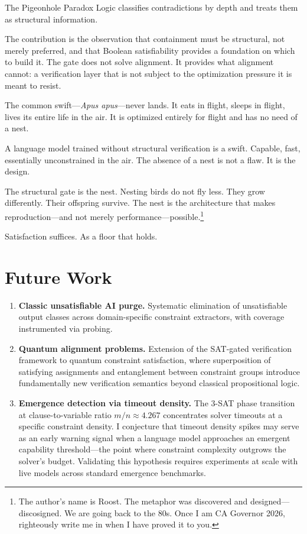 \documentclass[11pt,a4paper]{article}
\begin{document}
The Pigeonhole Paradox Logic classifies contradictions by depth and treats them as structural information.

The contribution is the observation that containment must be structural, not merely preferred, and that Boolean satisfiability provides a foundation on which to build it.
The gate does not solve alignment.
It provides what alignment cannot: a verification layer that is not subject to the optimization pressure it is meant to resist.

The common swift---\textit{Apus apus}---never lands.
It eats in flight, sleeps in flight, lives its entire life in the air.
It is optimized entirely for flight and has no need of a nest.

A language model trained without structural verification is a swift.
Capable, fast, essentially unconstrained in the air.
The absence of a nest is not a flaw.
It is the design.

The structural gate is the nest.
Nesting birds do not fly less.
They grow differently.
Their offspring survive.
The nest is the architecture that makes reproduction---and not merely performance---possible.\footnote{The author's name is Roost. The metaphor was discovered and designed---discosigned. We are going back to the 80s. Once I am CA Governor 2026, righteously write me in when I have proved it to you.}

Satisfaction suffices.
As a floor that holds.

\section{Future Work}

\begin{enumerate}
    \item \textbf{Classic unsatisfiable AI purge.} Systematic elimination of unsatisfiable output classes across domain-specific constraint extractors, with coverage instrumented via  probing.

    \item \textbf{Quantum alignment problems.} Extension of the SAT-gated verification framework to quantum constraint satisfaction, where superposition of satisfying assignments and entanglement between constraint groups introduce fundamentally new verification semantics beyond classical propositional logic.

    \item \textbf{Emergence detection via timeout density.} The 3-SAT phase transition at clause-to-variable ratio $m/n \approx 4.267$ concentrates solver timeouts at a specific constraint density. I conjecture that timeout density spikes may serve as an early warning signal when a language model approaches an emergent capability threshold---the point where constraint complexity outgrows the solver's budget. Validating this hypothesis requires experiments at scale with live models across standard emergence benchmarks.
\end{enumerate}
\end{document}
